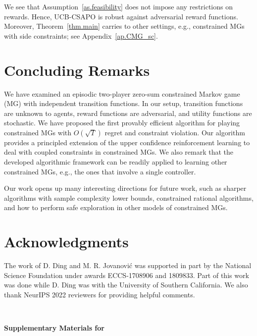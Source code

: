 \documentclass[12pt, final]{l4dc2023}
\begin{document}
We see that Assumption~\ref{as.feasibility} does not impose any restrictions on rewards. Hence, UCB-CSAPO is robust against adversarial reward functions.
Moreover, Theorem~\ref{thm.main} carries to other settings, e.g., constrained MGs with side constraints; see Appendix~\ref{ap.CMG_sc}. 

\vspace*{-1ex}
\section{Concluding Remarks}
\label{conclusion}

We have examined an episodic two-player zero-sum constrained Markov game (MG) with independent transition functions. In our setup, transition functions are unknown to agents, reward functions are adversarial, and utility functions are stochastic. We have proposed the first provably efficient algorithm for playing constrained MGs with $O(\sqrt{T})$ regret and constraint violation. Our algorithm provides a principled extension of the upper confidence reinforcement learning to deal with coupled constraints in constrained MGs. We also remark that the developed algorithmic framework can be readily applied to learning other constrained MGs, e.g., the ones that involve a single controller. 

Our work opens up many interesting directions for future work, such as sharper algorithms with sample complexity lower bounds, constrained rational algorithms, and how to perform safe exploration in other models of constrained MGs. 


\newpage

\vspace*{-2ex}
\section*{Acknowledgments}

The work of D. Ding and M. R. Jovanovi\'c was supported in part by the National Science Foundation under awards
ECCS-1708906 and 1809833. Part of this work was done while D. Ding was with the University of Southern California. We also thank NeurIPS 2022 reviewers for providing helpful comments. 



\newpage

\onecolumn

~\\
\centerline{{\fontsize{14}{14}\selectfont \textbf{Supplementary Materials for }}}
\end{document}
